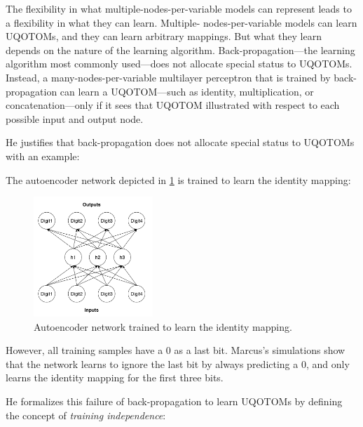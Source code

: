 \documentclass[../../main.tex]{subfiles}
\begin{document}
\begin{citecallout}
    The flexibility in what multiple-nodes-per-variable models
    can represent leads to a flexibility in what they can learn. Multiple-
    nodes-per-variable models can learn UQOTOMs, and they can learn
    arbitrary mappings. But what they learn depends on the nature of the
    learning algorithm. Back-propagation—the learning algorithm most
    commonly used—does not allocate special status to UQOTOMs. Instead, a many-nodes-per-variable multilayer perceptron that is trained
    by back-propagation can learn a UQOTOM—such as identity, multiplication, or concatenation—only if it sees that UQOTOM illustrated with
    respect to each possible input and output node.
\end{citecallout}

He justifies that back-propagation does not allocate special status to UQOTOMs with an example:

\begin{example}
    The autoencoder network depicted in \ref{fig:identity_autoencoder} is trained to learn the identity mapping:

    \begin{figure}[H]
        \centering
        \includegraphics[width=0.4\textwidth]{chapters/relations_between_variables/network.png}
        \caption{Autoencoder network trained to learn the identity mapping.}
        \label{fig:identity_autoencoder}
    \end{figure}

    However, all training samples have a 0 as a last bit. Marcus's simulations show that the network learns to ignore the last bit by always predicting a 0, and only learns the identity mapping for the first three bits.
\end{example}

He formalizes this failure of back-propagation to learn UQOTOMs by defining the concept of \emph{training independence}:
\end{document}
